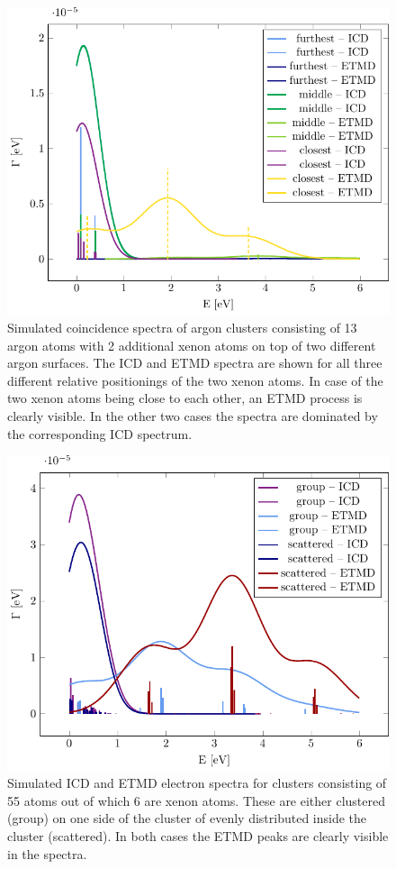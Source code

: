 \begin{figure}[h]
 \centering
 \includegraphics[scale=0.7]{pics/2tops.pdf}
 \caption{Simulated coincidence spectra of argon clusters consisting of 13
          argon atoms with 2 additional xenon atoms on top of two different
          argon surfaces. The ICD and ETMD spectra are shown for all three
          different relative positionings of the two xenon atoms. In case of
          the two xenon atoms being close to each other, an ETMD process is
          clearly visible. In the other two cases the spectra are dominated by
          the corresponding ICD spectrum.}
 \label{figure:2tops}
\end{figure}


\begin{figure}[h]
 \centering
 \includegraphics[scale=0.7]{pics/ar_3_6in.pdf}
 \caption{Simulated ICD and ETMD electron spectra for clusters consisting of
          55 atoms out of which 6 are xenon atoms. These are either clustered
          (group) on one side of the cluster of evenly distributed
          inside the cluster (scattered). In both cases the ETMD peaks are
          clearly visible in the spectra.}
 \label{figure:ar_3_6in}
\end{figure}


